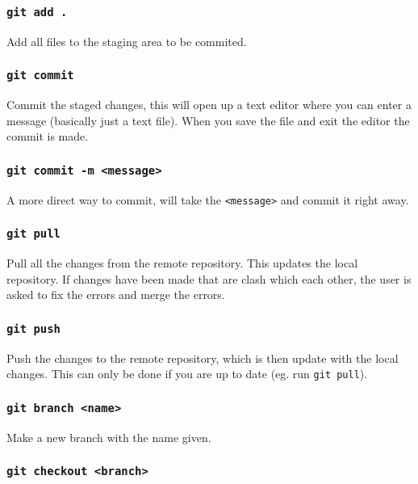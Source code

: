 \documentclass[12pt,a4paper]{article}
\begin{document}
			\subsubsection{\texttt{git add .}}
			
				Add all files to the staging area to be commited.
			
			\subsubsection{\texttt{git commit}}
			
				Commit the staged changes, this will open up a text editor where you can enter a message (basically just a text file). When you save the file and exit the editor the commit is made.
			
			\subsubsection{\texttt{git commit -m <message>}}
			
				A more direct way to commit, will take the \texttt{<message>} and commit it right away.
			
			\subsubsection{\texttt{git pull}}
			
				Pull all the changes from the remote repository. This updates the local repository. If changes have been made that are clash which each other, the user is asked to fix the errors and merge the errors. 
			
			\subsubsection{\texttt{git push}}
			
				Push the changes to the remote repository, which is then update with the local changes. This can only be done if you are up to date (eg. run \texttt{git pull}).
			
			\subsubsection{\texttt{git branch <name>}}
			
				Make a new branch with the name given.
			
			\subsubsection{\texttt{git checkout <branch>}}
			
\end{document}
